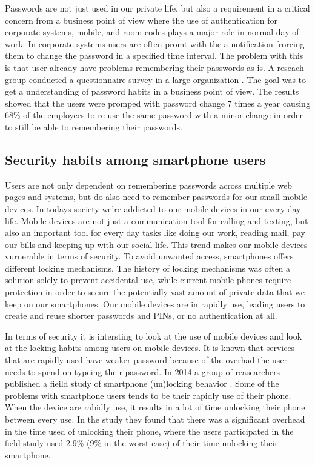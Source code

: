   Passwords are not just used in our private life, but also a requirement in a critical concern from a business point of view where the use of authentication for corporate systems, mobile, and room codes plays a major role in normal day of work. In corporate systems users are often promt with the a notification frorcing them to change the password in a specified time interval. The problem with this is that user already have problems remembering their passwords as is. A reseach group conducted a questionnaire survey in a large organization \cite{habits2}. The goal was to get a understanding of password habits in a business point of view. The results showed that the users were promped with password change 7 times a year causing 68\% of the employees to re-use the same password with a minor change in order to still be able to remembering their passwords.

  \subsection{Security habits among smartphone users}

  Users are not only dependent on remembering passwords across multiple web pages and systems, but do also need to remember passwords for our small mobile devices. In todays society we're addicted to our mobile devices in our every day life. Mobile devices are not just a communication tool for calling and texting, but also an important tool for every day tasks like doing our work, reading mail, pay our bills and keeping up with our social life. This trend makes our mobile devices vurnerable in terms of security. To avoid unwanted access, smartphones offers different locking mechanisms. The history of locking mechanisms was often a solution solely to prevent accidental use, while current mobile phones require protection in order to secure the potentially vast amount of private data that we keep on our smartphones. Our mobile devices are in rapidly use, leading users to create and reuse shorter passwords and PINs, or no authentication at all. 

  In terms of security it is intersting to look at the use of mobile devices and look at the locking habits among users on mobile devices. It is known that services that are rapidly used have weaker password because of the overhad the user needs to spend on typeing their password. In 2014 a group of reasearchers published a fieild study of smartphone (un)locking behavior \cite{habits3}. Some of the problems with smartphone users tends to be their rapidly use of their phone. When the device are rabidly use, it results in a lot of time unlocking their phone between every use. In the study they found that there was a significant overhead in the time used of unlocking their phone, where the users participated in the field study used 2.9\% (9\% in the worst case) of their time unlocking their smartphone. 
  
